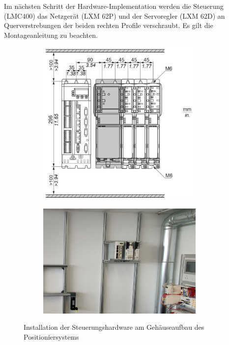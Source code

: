 \documentclass[../../../Bachelorarbeit.tex]{subfiles}
\begin{document}
Im nächsten Schritt der Hardware-Implementation werden die Steuerung (LMC400) das Netzgerät (LXM 62P) und der Servoregler (LXM 62D) an Querverstrebungen der beiden rechten Profile verschraubt. Es gilt die Montageanleitung zu beachten. %

\begin{figure}[H]
    \centering
    \begin{subfigure}[c]{0.42\textwidth}
        \centering
        \includegraphics[width=0.9\textwidth]{Images/Steuerungshardwareinstallation.jpg}
    \end{subfigure}
    \begin{subfigure}[c]{0.42\textwidth}
        \centering
        \includegraphics[width=0.9\textwidth]{Images/Steuerungshardware.jpg}
    \end{subfigure}
    \caption[Steuerungsinstallation]{Installation der Steuerungshardware am Gehäuseaufbau des Positioniersystems}
    \label{fig:my-img21}
\end{figure}
\end{document}
